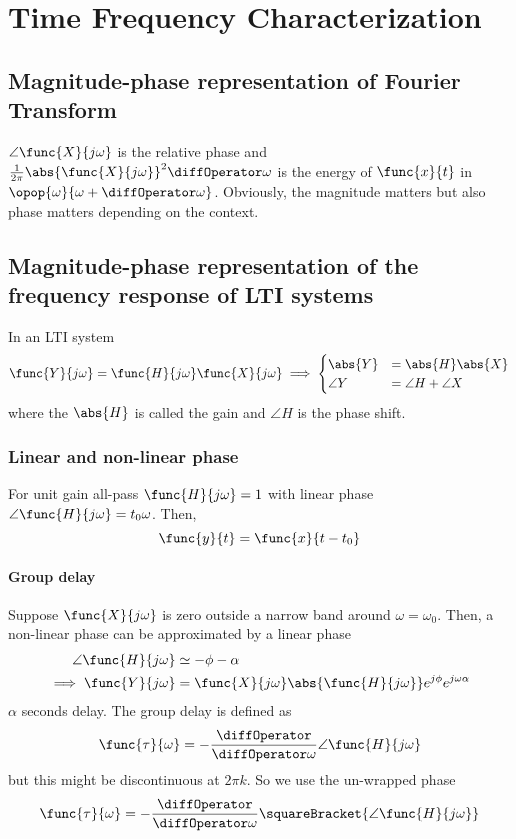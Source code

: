 \chapter{Time Frequency Characterization}
\section{Magnitude-phase representation of Fourier Transform}
\(\angle \func{X}{j\omega}\) is the relative phase and \(\frac{1}{2\pi}\abs{\func{X}{j\omega}}^2 \diffOperator \omega \) is the energy of \(\func{x}{t}\) in \(\opop{\omega}{ \omega + \diffOperator \omega}\). Obviously, the magnitude matters but also phase matters depending on the context. 
\section{Magnitude-phase representation of the frequency response of LTI systems}
In an LTI system 
\begin{equation*}
    \func{Y}{j\omega} = \func{H}{j\omega} \func{X}{j\omega} \implies \begin{cases}
        \abs{Y} &= \abs{H} \abs{X} \\
        \angle Y &= \angle H + \angle X
    \end{cases}
\end{equation*}
where the \(\abs{H}\) is called the gain and \(\angle H\) is the phase shift. 
\subsection*{Linear and non-linear phase}
For unit gain all-pass \(\func{H}{j\omega} = 1\) with linear phase \(\angle \func{H}{j\omega} = t_0 \omega\). Then, 
\begin{equation*}
    \func{y}{t} = \func{x}{t - t_0}
\end{equation*}
\subsubsection*{Group delay}
Suppose \(\func{X}{j\omega}\) is zero outside a narrow band around \(\omega = \omega_0\). Then, a non-linear phase can be approximated by a linear phase 
\begin{align*}
    \angle \func{H}{j\omega} &\simeq - \phi - \alpha \\
    \implies \func{Y}{j\omega} &= \func{X}{j\omega} \abs{\func{H}{j\omega}} e^{j\phi} e^{j \omega \alpha}
\end{align*}
\(\alpha\) seconds delay. The group delay is defined as 
\begin{equation*}
    \func{\tau}{\omega} = - \dfrac{\diffOperator}{\diffOperator \omega} \angle \func{H}{j\omega}
\end{equation*}
but this might be discontinuous at \(2\pi k\). So we use the un-wrapped phase 
\begin{equation*}
    \func{\tau}{\omega} = - \dfrac{\diffOperator}{\diffOperator \omega} \squareBracket{\angle \func{H}{j\omega}}
\end{equation*}

